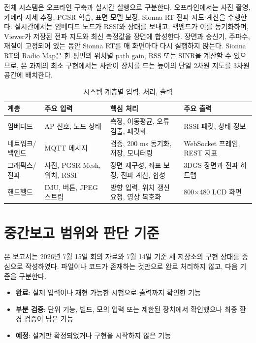 \documentclass[titlepage]{pnureport}
\begin{document}
전체 시스템은 오프라인 구축과 실시간 실행으로 구분한다. 오프라인에서는 사진 촬영, 카메라 자세 추정, PGSR 학습, 표면 모델 보정, Sionna RT 전파 지도 계산을 수행한다. 실시간에서는 임베디드 노드가 RSSI와 상태를 보내고, 백엔드가 이를 동기화하며, Viewer가 저장된 전파 지도와 최신 측정값을 장면에 합성한다. 장면과 송신기, 주파수, 재질이 고정되어 있는 동안 Sionna RT를 매 화면마다 다시 실행하지 않는다. Sionna RT의 Radio Map은 한 평면의 위치별 path gain, RSS 또는 SINR을 계산할 수 있으므로\cite{aitaoudia2025sionna}, 본 과제의 최소 구현에서는 사람이 장치를 드는 높이의 단일 2차원 지도를 3차원 공간에 배치한다.

\begin{table}[H]
\centering
\caption{시스템 계층별 입력, 처리, 출력}
\label{tab:system-layers}
\begin{tabularx}{\textwidth}{C{2.4cm}YYY}
\toprule
계층 & 주요 입력 & 핵심 처리 & 주요 출력 \\
\midrule
임베디드 & AP 신호, 노드 상태 & 측정, 이동평균, 오류 검출, 패킷화 & RSSI 패킷, 상태 정보 \\
네트워크/백엔드 & MQTT 메시지 & 검증, 200 ms 동기화, 저장, 모니터링 & WebSocket 프레임, REST 지표 \\
그래픽스/전파 & 사진, PGSR Mesh, 위치, RSSI & 장면 재구성, 좌표 보정, 전파 계산, 합성 & 3DGS 장면과 전파 히트맵 \\
핸드헬드 & IMU, 버튼, JPEG 스트림 & 방향 입력, 위치 갱신 요청, 영상 복호화 & 800$\times$480 LCD 화면 \\
\bottomrule
\end{tabularx}
\end{table}

\section{중간보고 범위와 판단 기준}

본 보고서는 2026년 7월 15일 회의 자료와 7월 14일 기준 세 저장소의 구현 상태를 중심으로 작성하였다\cite{rfvisualizerRepo,networkRepo,embeddedRepo}. 파일이나 코드가 존재하는 것만으로 완료 처리하지 않고, 다음 기준을 구분한다.

\begin{itemize}
  \item \textbf{완료}: 실제 입력이나 재현 가능한 시험으로 출력까지 확인한 기능
  \item \textbf{부분 검증}: 단위 기능, 빌드, 모의 입력 또는 제한된 장치에서 확인했으나 최종 환경 검증이 남은 기능
  \item \textbf{예정}: 설계만 확정되었거나 구현을 시작하지 않은 기능
\end{itemize}
\end{document}
